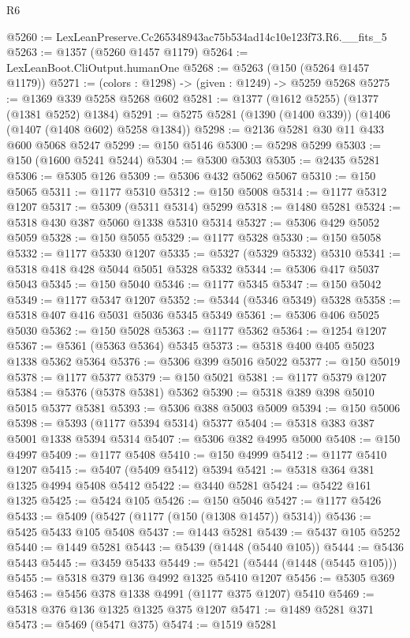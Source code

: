 \begin{lexlean}{R6}
\begin{coremodule}
@5260 := LexLeanPreserve.Cc265348943ac75b534ad14c10e123f73.R6.__fits_5
@5263 := @1357 (@5260 @1457 @1179)
@5264 := LexLeanBoot.CliOutput.humanOne
@5268 := @5263 (@150 (@5264 @1457 @1179))
@5271 := (colors : @1298) -> (given : @1249) -> @5259 @5268
@5275 := @1369 @339 @5258 @5268 @602
@5281 := @1377 (@1612 @5255) (@1377 (@1381 @5252) @1384)
@5291 := @5275 @5281 (@1390 (@1400 @339)) (@1406 (@1407 (@1408 @602) @5258 @1384))
@5298 := @2136 @5281 @30 @11 @433 @600 @5068 @5247
@5299 := @150 @5146
@5300 := @5298 @5299
@5303 := @150 (@1600 @5241 @5244)
@5304 := @5300 @5303
@5305 := @2435 @5281
@5306 := @5305 @126
@5309 := @5306 @432 @5062 @5067
@5310 := @150 @5065
@5311 := @1177 @5310
@5312 := @150 @5008
@5314 := @1177 @5312 @1207
@5317 := @5309 (@5311 @5314) @5299
@5318 := @1480 @5281
@5324 := @5318 @430 @387 @5060 @1338 @5310 @5314
@5327 := @5306 @429 @5052 @5059
@5328 := @150 @5055
@5329 := @1177 @5328
@5330 := @150 @5058
@5332 := @1177 @5330 @1207
@5335 := @5327 (@5329 @5332) @5310
@5341 := @5318 @418 @428 @5044 @5051 @5328 @5332
@5344 := @5306 @417 @5037 @5043
@5345 := @150 @5040
@5346 := @1177 @5345
@5347 := @150 @5042
@5349 := @1177 @5347 @1207
@5352 := @5344 (@5346 @5349) @5328
@5358 := @5318 @407 @416 @5031 @5036 @5345 @5349
@5361 := @5306 @406 @5025 @5030
@5362 := @150 @5028
@5363 := @1177 @5362
@5364 := @1254 @1207
@5367 := @5361 (@5363 @5364) @5345
@5373 := @5318 @400 @405 @5023 @1338 @5362 @5364
@5376 := @5306 @399 @5016 @5022
@5377 := @150 @5019
@5378 := @1177 @5377
@5379 := @150 @5021
@5381 := @1177 @5379 @1207
@5384 := @5376 (@5378 @5381) @5362
@5390 := @5318 @389 @398 @5010 @5015 @5377 @5381
@5393 := @5306 @388 @5003 @5009
@5394 := @150 @5006
@5398 := @5393 (@1177 @5394 @5314) @5377
@5404 := @5318 @383 @387 @5001 @1338 @5394 @5314
@5407 := @5306 @382 @4995 @5000
@5408 := @150 @4997
@5409 := @1177 @5408
@5410 := @150 @4999
@5412 := @1177 @5410 @1207
@5415 := @5407 (@5409 @5412) @5394
@5421 := @5318 @364 @381 @1325 @4994 @5408 @5412
@5422 := @3440 @5281
@5424 := @5422 @161 @1325
@5425 := @5424 @105
@5426 := @150 @5046
@5427 := @1177 @5426
@5433 := @5409 (@5427 (@1177 (@150 (@1308 @1457)) @5314))
@5436 := @5425 @5433 @105 @5408
@5437 := @1443 @5281
@5439 := @5437 @105 @5252
@5440 := @1449 @5281
@5443 := @5439 (@1448 (@5440 @105))
@5444 := @5436 @5443
@5445 := @3459 @5433
@5449 := @5421 (@5444 (@1448 (@5445 @105)))
@5455 := @5318 @379 @136 @4992 @1325 @5410 @1207
@5456 := @5305 @369
@5463 := @5456 @378 @1338 @4991 (@1177 @375 @1207) @5410
@5469 := @5318 @376 @136 @1325 @1325 @375 @1207
@5471 := @1489 @5281 @371
@5473 := @5469 (@5471 @375)
@5474 := @1519 @5281

\end{coremodule}
\end{lexlean}
